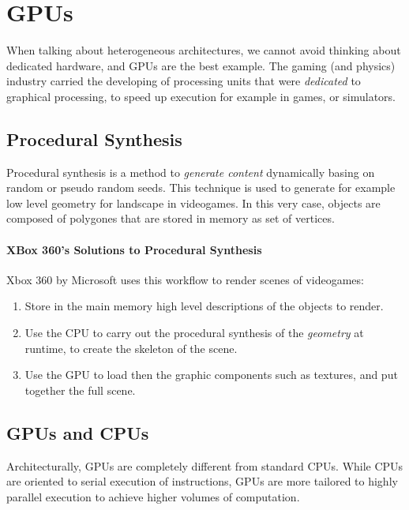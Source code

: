 \documentclass[10pt,a4paper]{article}
\begin{document}
		\section{GPUs}
			When talking about heterogeneous architectures, we cannot avoid thinking about dedicated hardware, and GPUs are the best example. The gaming (and physics) industry carried the developing of processing units that were \emph{dedicated} to graphical processing, to speed up execution for example in games, or simulators.
			
			\subsection{Procedural Synthesis}
				Procedural synthesis is a method to \emph{generate content} dynamically basing on random or pseudo random seeds. This technique is used to generate for example low level geometry for landscape in videogames. In this very case, objects are composed of polygones that are stored in memory as set of vertices.
				
				\paragraph{XBox 360's Solutions to Procedural Synthesis}
					Xbox 360 by Microsoft uses this workflow to render scenes of videogames:
					\begin{enumerate}
						\item Store in the main memory high level descriptions of the objects to render.
						\item Use the CPU to carry out the procedural synthesis of the \emph{geometry} at runtime, to create the skeleton of the scene.
						\item Use the GPU to load then the graphic components such as textures, and put together the full scene.
					\end{enumerate}
			
			\subsection{GPUs and CPUs}
				Architecturally, GPUs are completely different from standard CPUs. While CPUs are oriented to serial execution of instructions, GPUs are more tailored to highly parallel execution to achieve higher volumes of computation.
				
\end{document}
